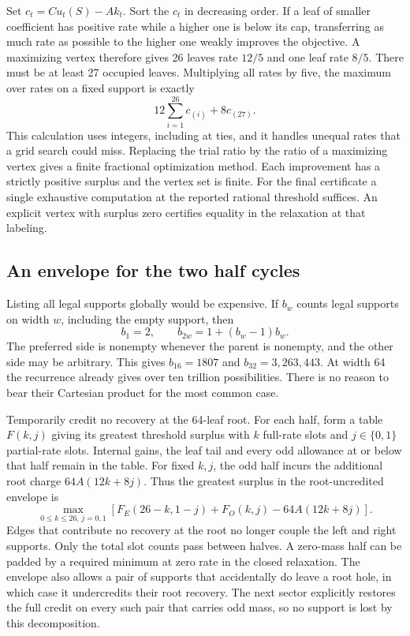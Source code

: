 Set \(c_t=Cu_t(S)-Ak_t\). Sort the \(c_t\) in decreasing order. If a leaf of smaller coefficient has positive rate while a higher one is below its cap, transferring as much rate as possible to the higher one weakly improves the objective. A maximizing vertex therefore gives 26 leaves rate \(12/5\) and one leaf rate \(8/5\). There must be at least 27 occupied leaves. Multiplying all rates by five, the maximum over rates on a fixed support is exactly
\[
              12\sum_{i=1}^{26}c_{(i)}+8c_{(27)} .
\]
This calculation uses integers, including at ties, and it handles unequal rates that a grid search could miss. Replacing the trial ratio by the ratio of a maximizing vertex gives a finite fractional optimization method. Each improvement has a strictly positive surplus and the vertex set is finite. For the final certificate a single exhaustive computation at the reported rational threshold suffices. An explicit vertex with surplus zero certifies equality in the relaxation at that labeling.

\subsection{An envelope for the two half cycles}

Listing all legal supports globally would be expensive. If \(b_w\) counts legal supports on width \(w\), including the empty support, then
\[
                  b_1=2,\qquad b_{2w}=1+(b_w-1)b_w .
\]
The preferred side is nonempty whenever the parent is nonempty, and the other side may be arbitrary. This gives \(b_{16}=1807\) and \(b_{32}=3{,}263{,}443\). At width 64 the recurrence already gives over ten trillion possibilities. There is no reason to bear their Cartesian product for the most common case.

Temporarily credit no recovery at the 64-leaf root. For each half, form a table \(F(k,j)\) giving its greatest threshold surplus with \(k\) full-rate slots and \(j\in\{0,1\}\) partial-rate slots. Internal gains, the leaf tail and every odd allowance at or below that half remain in the table. For fixed \(k,j\), the odd half incurs the additional root charge \(64 A(12k+8j)\). Thus the greatest surplus in the root-uncredited envelope is
\[
 \max_{0\le k\le26,\,j=0,1}
 \left[F_E(26-k,1-j)+F_O(k,j)-64A(12k+8j)\right].
\]
Edges that contribute no recovery at the root no longer couple the left and right supports. Only the total slot counts pass between halves. A zero-mass half can be padded by a required minimum at zero rate in the closed relaxation. The envelope also allows a pair of supports that accidentally do leave a root hole, in which case it undercredits their root recovery. The next sector explicitly restores the full credit on every such pair that carries odd mass, so no support is lost by this decomposition.

